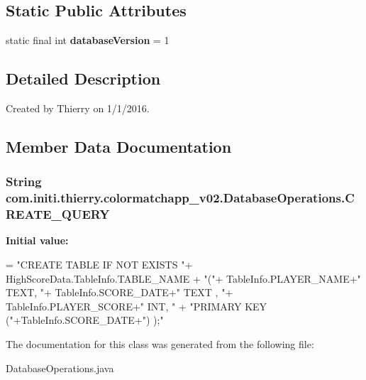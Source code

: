 \subsection*{Static Public Attributes}
\begin{DoxyCompactItemize}
\item 
static final int {\bfseries database\+Version} = 1\hypertarget{classcom_1_1initi_1_1thierry_1_1colormatchapp__v02_1_1_database_operations_a044c03906d4666706d456c1e40b63507}{}\label{classcom_1_1initi_1_1thierry_1_1colormatchapp__v02_1_1_database_operations_a044c03906d4666706d456c1e40b63507}

\end{DoxyCompactItemize}


\subsection{Detailed Description}
Created by Thierry on 1/1/2016. 

\subsection{Member Data Documentation}
\subsubsection[{\texorpdfstring{C\+R\+E\+A\+T\+E\+\_\+\+Q\+U\+E\+RY}{CREATE_QUERY}}]{\setlength{\rightskip}{0pt plus 5cm}String com.\+initi.\+thierry.\+colormatchapp\+\_\+v02.\+Database\+Operations.\+C\+R\+E\+A\+T\+E\+\_\+\+Q\+U\+E\+RY}\hypertarget{classcom_1_1initi_1_1thierry_1_1colormatchapp__v02_1_1_database_operations_af7687136987b9759e38948379d016014}{}\label{classcom_1_1initi_1_1thierry_1_1colormatchapp__v02_1_1_database_operations_af7687136987b9759e38948379d016014}
{\bfseries Initial value\+:}
\begin{DoxyCode}
= \textcolor{stringliteral}{"CREATE TABLE IF NOT EXISTS "}+ HighScoreData.TableInfo.TABLE\_NAME +
            \textcolor{stringliteral}{"("}+ TableInfo.PLAYER\_NAME+\textcolor{stringliteral}{" TEXT, "}+ TableInfo.SCORE\_DATE+\textcolor{stringliteral}{" TEXT , "}+ TableInfo.PLAYER\_SCORE+\textcolor{stringliteral}{"
       INT, "} +
            \textcolor{stringliteral}{"PRIMARY KEY ("}+TableInfo.SCORE\_DATE+\textcolor{stringliteral}{") );"}
\end{DoxyCode}


The documentation for this class was generated from the following file\+:\begin{DoxyCompactItemize}
\item 
Database\+Operations.\+java\end{DoxyCompactItemize}
